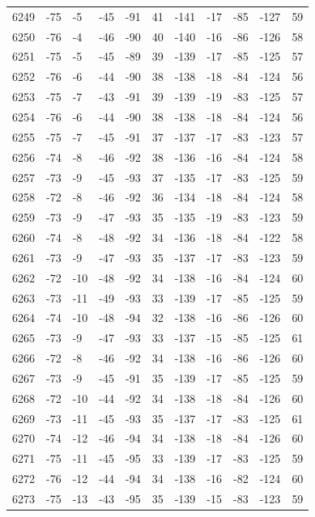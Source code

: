 \begin{table}[H]
\begin{tabular}{lllllllllll}
6249 & -75 & -5 & -45 & -91 & 41 & -141 & -17 & -85 & -127 & 59 \\
6250 & -76 & -4 & -46 & -90 & 40 & -140 & -16 & -86 & -126 & 58 \\
6251 & -75 & -5 & -45 & -89 & 39 & -139 & -17 & -85 & -125 & 57 \\
6252 & -76 & -6 & -44 & -90 & 38 & -138 & -18 & -84 & -124 & 56 \\
6253 & -75 & -7 & -43 & -91 & 39 & -139 & -19 & -83 & -125 & 57 \\
6254 & -76 & -6 & -44 & -90 & 38 & -138 & -18 & -84 & -124 & 56 \\
6255 & -75 & -7 & -45 & -91 & 37 & -137 & -17 & -83 & -123 & 57 \\
6256 & -74 & -8 & -46 & -92 & 38 & -136 & -16 & -84 & -124 & 58 \\
6257 & -73 & -9 & -45 & -93 & 37 & -135 & -17 & -83 & -125 & 59 \\
6258 & -72 & -8 & -46 & -92 & 36 & -134 & -18 & -84 & -124 & 58 \\
6259 & -73 & -9 & -47 & -93 & 35 & -135 & -19 & -83 & -123 & 59 \\
6260 & -74 & -8 & -48 & -92 & 34 & -136 & -18 & -84 & -122 & 58 \\
6261 & -73 & -9 & -47 & -93 & 35 & -137 & -17 & -83 & -123 & 59 \\
6262 & -72 & -10 & -48 & -92 & 34 & -138 & -16 & -84 & -124 & 60 \\
6263 & -73 & -11 & -49 & -93 & 33 & -139 & -17 & -85 & -125 & 59 \\
6264 & -74 & -10 & -48 & -94 & 32 & -138 & -16 & -86 & -126 & 60 \\
6265 & -73 & -9 & -47 & -93 & 33 & -137 & -15 & -85 & -125 & 61 \\
6266 & -72 & -8 & -46 & -92 & 34 & -138 & -16 & -86 & -126 & 60 \\
6267 & -73 & -9 & -45 & -91 & 35 & -139 & -17 & -85 & -125 & 59 \\
6268 & -72 & -10 & -44 & -92 & 34 & -138 & -18 & -84 & -126 & 60 \\
6269 & -73 & -11 & -45 & -93 & 35 & -137 & -17 & -83 & -125 & 61 \\
6270 & -74 & -12 & -46 & -94 & 34 & -138 & -18 & -84 & -126 & 60 \\
6271 & -75 & -11 & -45 & -95 & 33 & -139 & -17 & -83 & -125 & 59 \\
6272 & -76 & -12 & -44 & -94 & 34 & -138 & -16 & -82 & -124 & 60 \\
6273 & -75 & -13 & -43 & -95 & 35 & -139 & -15 & -83 & -123 & 59 \\

\end{tabular}
\end{table}
